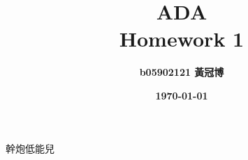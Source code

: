 \documentclass[12pt,a4paper]{extarticle}
\title{\bf ADA\\Homework 1}
\author{\bf b05902121 黃冠博}
\date{\bf \today}
\begin{document}
\maketitle
幹炮低能兒
\end{document}
